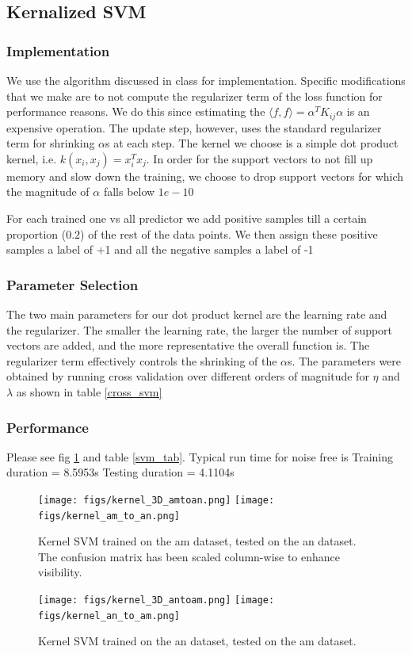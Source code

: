 \documentclass[10pt,a4paper]{article}
\begin{document}
\subsection{Kernalized SVM}
\subsubsection{Implementation}
We use the algorithm discussed in class for implementation. Specific modifications that we make are to not compute the regularizer term of the loss function for performance reasons. We do this since estimating the $\langle f, f \rangle = \alpha^T K_{ij} \alpha$ is an expensive operation. The update step, however, uses the standard regularizer term for shrinking $\alpha$s at each step. The kernel we choose is a simple dot product kernel, i.e. $k(x_i, x_j) = x_i^T x_j$. In order for the support vectors to not fill up memory and slow down the training, we choose to drop support vectors for which the magnitude of $\alpha$ falls below $1e-10$

For each trained one vs all predictor we add positive samples till a certain proportion ($0.2$) of the rest of the data points. We then assign these positive samples a label of +1 and all the negative samples a label of -1
\subsubsection{Parameter Selection}
The two main parameters for our dot product kernel are the learning rate and the regularizer. The smaller the learning rate, the larger the number of support vectors are added, and the more representative the overall function is. The regularizer term effectively controls the shrinking of the $\alpha$s. The parameters were obtained by running cross validation over different orders of magnitude for $\eta$ and $\lambda$ as shown in table \ref{cross_svm}

\subsubsection{Performance}
Please see fig \ref{svm_fig} and table \ref{svm_tab}. Typical run time for noise free is 
Training duration =  8.5953s
Testing duration =  4.1104s
\begin{figure}[h]
\centering
\texttt{[image: figs/kernel\_3D\_amtoan.png]}
\texttt{[image: figs/kernel\_am\_to\_an.png]}
\caption{Kernel SVM trained on the am dataset, tested on the an dataset. The confusion matrix has been scaled column-wise to enhance visibility.}
\vspace{10pt}
\texttt{[image: figs/kernel\_3D\_antoam.png]}
\texttt{[image: figs/kernel\_an\_to\_am.png]}
\caption{Kernel SVM trained on the an dataset, tested on the am dataset. }
\label{svm_fig}
\end{figure}
\end{document}
